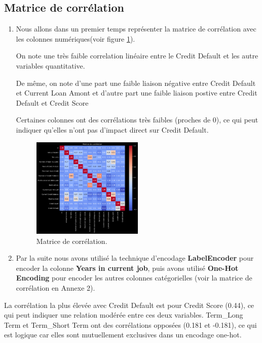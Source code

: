 \subsection{Matrice de corrélation}
\begin{enumerate}
\item Nous allons dans un premier temps représenter la matrice de corrélation avec les colonnes numériques(voir figure \ref{fig:matrice_corr}). 

On note une très faible correlation linéaire entre le Credit Default et les autre variables quantitative.

De même, on note d'une part une faible liaison négative entre Credit Default et Current Loan Amont et d'autre part une faible liaison postive entre Credit Default et Credit Score

Certaines colonnes ont des corrélations très faibles (proches de 0), ce qui peut indiquer qu'elles n'ont pas d'impact direct sur Credit Default.
 

\begin{figure}[h]
\centering
\includegraphics[width=0.5\textwidth]{figures/Matrice1.png}
\caption{Matrice de corrélation.}
\label{fig:matrice_corr}
\end{figure}


\item Par la suite nous avons utilisé la technique d'encodage \textbf{LabelEncoder} pour encoder la colonne \textbf{Years in current job}, puis avons utilisé \textbf{One-Hot Encoding} pour encoder les autres colonnes catégorielles (voir la matrice de corrélation en Annexe 2). 
\end{enumerate}

La corrélation la plus élevée avec Credit Default est pour Credit Score (0.44), ce qui peut indiquer une relation modérée entre ces deux variables.
Term\_Long Term et Term\_Short Term ont des corrélations opposées (0.181 et -0.181), ce qui est logique car elles sont mutuellement exclusives dans un encodage one-hot.

